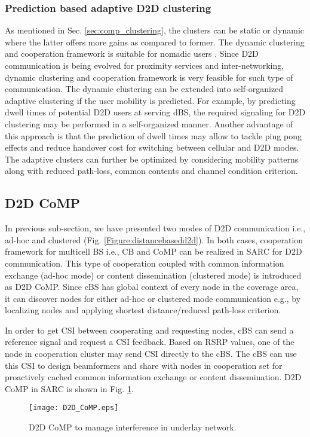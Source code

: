 \documentclass[article,10pt,twocolumn]{IEEEtran}
\begin{document}
\subsubsection{Prediction based adaptive D2D clustering}
As mentioned in Sec. \ref{sec:comp_clustering}, the clusters can be static or dynamic where the latter offers more gains as compared to former. The dynamic clustering and cooperation framework is suitable for nomadic users \citep{marsch_coordinated_2011}. Since D2D communication is being evolved for proximity services and inter-networking, dynamic clustering and cooperation framework is very feasible for such type of communication. The dynamic clustering can be extended into self-organized adaptive clustering if the user mobility is predicted. For example, by predicting dwell times of potential D2D users at serving dBS, the required signaling for D2D clustering may be performed in a self-organized manner. Another advantage of this approach is that the prediction of dwell times may allow to tackle ping pong effects and reduce handover cost for switching between cellular and D2D modes. The adaptive clusters can further be optimized by considering mobility patterns along with reduced path-loss, common contents and channel condition criterion.
\subsection{D2D CoMP}\label{sec:d2d_comp}
In previous sub-section, we have presented two modes of D2D communication i.e., ad-hoc and clustered (Fig. \ref{Figure:distancebasedd2d}). In both cases, cooperation framework for multicell BS i.e., CB and CoMP can be realized in SARC for D2D communication. This type of cooperation coupled with common information exchange (ad-hoc mode) or content dissemination (clustered mode) is introduced as D2D CoMP. Since cBS has global context of every node in the coverage area, it can discover nodes for either ad-hoc or clustered mode communication e.g., by localizing nodes and applying shortest distance/reduced path-loss criterion. 

In order to get CSI between cooperating and requesting nodes, cBS can send a reference signal and request a CSI feedback. Based on RSRP values, one of the node in cooperation cluster may send CSI directly to the cBS. The cBS can use this CSI to design beamformers and share with nodes in cooperation set for proactively cached common information exchange or content dissemination. D2D CoMP in SARC is shown in Fig. \ref{Figure:d2dCoMP}.
\begin{figure}[!htb]
\centering
\texttt{[image: D2D\_CoMP.eps]}
\caption{D2D CoMP to manage interference in underlay network.}\label{Figure:d2dCoMP}
\vspace{-4mm}
\end{figure}
\end{document}
